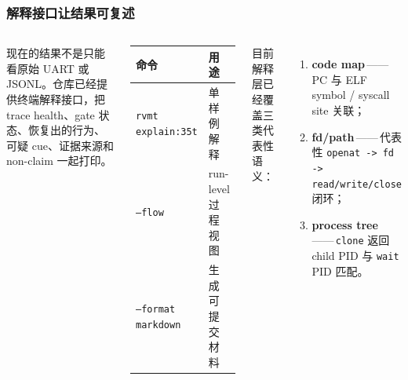 \documentclass[aspectratio=169,10pt]{beamer}
\begin{document}
\begin{frame}
  \frametitle{解释接口让结果可复述}
  \vskip0.05cm
  \begin{columns}[T,onlytextwidth]
    \small
    现在的结果不是只能看原始 UART 或 JSONL。仓库已经提供终端解释接口，把 trace health、gate 状态、恢复出的行为、可疑 cue、证据来源和 non-claim 一起打印。

    \vskip0.2cm
    \begin{center}
    \scriptsize
    \begin{tabular}{@{}ll@{}}
      \toprule
      \textbf{命令} & \textbf{用途} \\
      \midrule
      \texttt{rvmt explain:35t} & 单样例解释 \\
      \texttt{--flow} & run-level 过程视图 \\
      \texttt{--format markdown} & 生成可提交材料 \\
      \bottomrule
    \end{tabular}
    \end{center}

    \small
    目前解释层已经覆盖三类代表性语义：

    \vskip0.2cm
    \begin{enumerate}\setlength\itemsep{0.45em}
      \item \textbf{code map}\,——\,PC 与 ELF symbol / syscall site 关联；
      \item \textbf{fd/path}\,——\,代表性 \texttt{openat -> fd -> read/write/close} 闭环；
      \item \textbf{process tree}\,——\,\texttt{clone} 返回 child PID 与 \texttt{wait} PID 匹配。
    \end{enumerate}
  \end{columns}
\end{frame}
\end{document}
